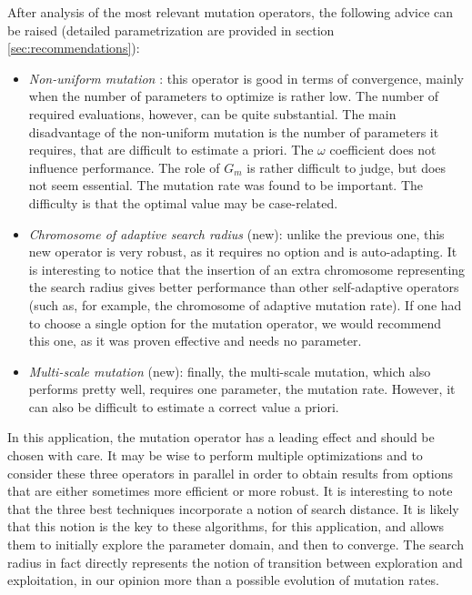 \documentclass[twocol]{ametsoc}
\begin{document}
After analysis of the most relevant mutation operators, the following advice can be raised (detailed parametrization are provided in section \ref{sec:recommendations}):

\begin{itemize}
	
	\item \textit{Non-uniform mutation} \citep{Michalewicz1996}: this operator is good in terms of convergence, mainly when the number of parameters to optimize is rather low. The number of required evaluations, however, can be quite substantial. The main disadvantage of the non-uniform mutation is the number of parameters it requires, that are difficult to estimate a priori. The $\omega$ coefficient does not influence performance. The role of $G_{m}$ is rather difficult to judge, but does not seem essential. The mutation rate was found to be important. The difficulty is that the optimal value may be case-related.
	
	\item \textit{Chromosome of adaptive search radius} (new): unlike the previous one, this new operator is very robust, as it requires no option and is auto-adapting. It is interesting to notice that the insertion of an extra chromosome representing the search radius gives better performance than other self-adaptive operators (such as, for example, the chromosome of adaptive mutation rate). If one had to choose a single option for the mutation operator, we would recommend this one, as it was proven effective and needs no parameter.
	
	\item \textit{Multi-scale mutation} (new): finally, the multi-scale mutation, which also performs pretty well, requires one parameter, the mutation rate. However, it can also be difficult to estimate a correct value a priori.
	
\end{itemize}

In this application, the mutation operator has a leading effect and should be chosen with care. It may be wise to perform multiple optimizations and to consider these three operators in parallel in order to obtain results from options that are either sometimes more efficient or more robust. It is interesting to note that the three best techniques incorporate a notion of search distance. It is likely that this notion is the key to these algorithms, for this application, and allows them to initially explore the parameter domain, and then to converge. The search radius in fact directly represents the notion of transition between exploration and exploitation, in our opinion more than a possible evolution of mutation rates.
\end{document}
